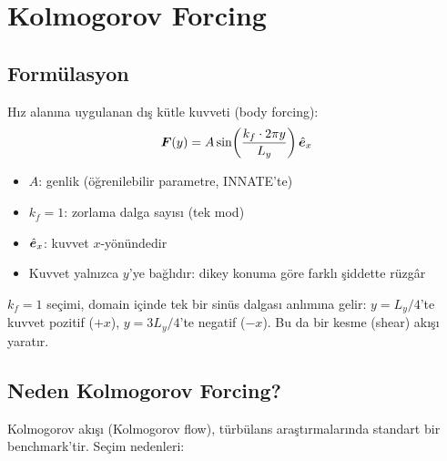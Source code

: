 

\section{Kolmogorov Forcing}
\label{sec:kolmogorov_forcing}

\subsection{Formülasyon}

Hız alanına uygulanan dış kütle kuvveti (body forcing):
\begin{equation}
    \bm{F}(y) = A \sin\!\left(\frac{k_f \cdot 2\pi y}{L_y}\right) \hat{\bm{e}}_x
    \label{eq:kolmogorov_forcing}
\end{equation}
\begin{itemize}
    \item $A$: genlik (öğrenilebilir parametre, INNATE'te)
    \item $k_f = 1$: zorlama dalga sayısı (tek mod)
    \item $\hat{\bm{e}}_x$: kuvvet $x$-yönündedir
    \item Kuvvet yalnızca $y$'ye bağlıdır: dikey konuma göre farklı şiddette rüzgâr
\end{itemize}

$k_f = 1$ seçimi, domain içinde tek bir sinüs dalgası anlımına gelir: $y = L_y/4$'te kuvvet pozitif ($+x$), $y = 3L_y/4$'te negatif ($-x$). Bu da bir kesme (shear) akışı yaratır.

\subsection{Neden Kolmogorov Forcing?}

Kolmogorov akışı (Kolmogorov flow), türbülans araştırmalarında standart bir benchmark'tir. Seçim nedenleri:

